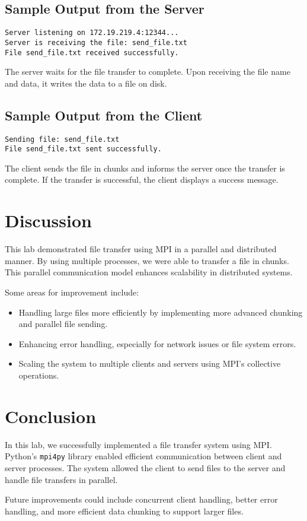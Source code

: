\documentclass[a4paper,12pt]{article}
\begin{document}
\subsection{Sample Output from the Server}

\begin{verbatim}
Server listening on 172.19.219.4:12344...
Server is receiving the file: send_file.txt
File send_file.txt received successfully.
\end{verbatim}

The server waits for the file transfer to complete. Upon receiving the file name and data, it writes the data to a file on disk.

\subsection{Sample Output from the Client}

\begin{verbatim}
Sending file: send_file.txt
File send_file.txt sent successfully.
\end{verbatim}

The client sends the file in chunks and informs the server once the transfer is complete. If the transfer is successful, the client displays a success message.

\section{Discussion}
This lab demonstrated file transfer using MPI in a parallel and distributed manner. By using multiple processes, we were able to transfer a file in chunks. This parallel communication model enhances scalability in distributed systems.

Some areas for improvement include:
\begin{itemize}
    \item Handling large files more efficiently by implementing more advanced chunking and parallel file sending.
    \item Enhancing error handling, especially for network issues or file system errors.
    \item Scaling the system to multiple clients and servers using MPI's collective operations.
\end{itemize}

\section{Conclusion}
In this lab, we successfully implemented a file transfer system using MPI. Python's \texttt{mpi4py} library enabled efficient communication between client and server processes. The system allowed the client to send files to the server and handle file transfers in parallel.

Future improvements could include concurrent client handling, better error handling, and more efficient data chunking to support larger files.
\end{document}
